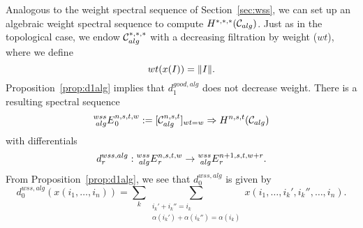 Analogous to the weight spectral sequence of Section~\ref{sec:wss}, we can set up an algebraic weight spectral sequence to compute $H^{*,*,*}(\mathcal{C}_{alg})$. 
Just as in the topological case, we endow $\mathcal{C}^{*,*,*}_{alg}$ with a decreasing filtration by weight ({$wt$}), where we define
\[ wt(x(I)) = \lVert I \rVert. \]
Proposition~\ref{prop:d1alg} implies that $d_1^{good, alg}$ does not decrease weight.  There is a resulting spectral sequence
\[ \prescript{wss}{alg}{E}_0^{n,s,t,w} := [\mathcal{C}^{n,s,t}_{alg}]_{wt=w} \Rightarrow H^{n,s,t}(\mathcal{C}_{alg}) \]
with differentials
\[ d_r^{wss, alg}: \prescript{wss}{alg}{E}_r^{n,s,t,w} \rightarrow \prescript{wss}{alg}{E}_r^{n+1, s,t, w+r}. \]
From Proposition~\ref{prop:d1alg}, we see that $d_0^{wss, alg}$ is given by
\begin{equation}\label{eq:d0wssalg} 
d_0^{wss, alg}(x(i_1, \ldots, i_n)) = \sum_k \sum_{
\substack{i_k'+i_k'' = i_k \\ \alpha(i_k')+\alpha(i_k'') = \alpha(i_k)}} x(i_1, \ldots, i_k', i_k'', \ldots, i_n). 
\end{equation}


